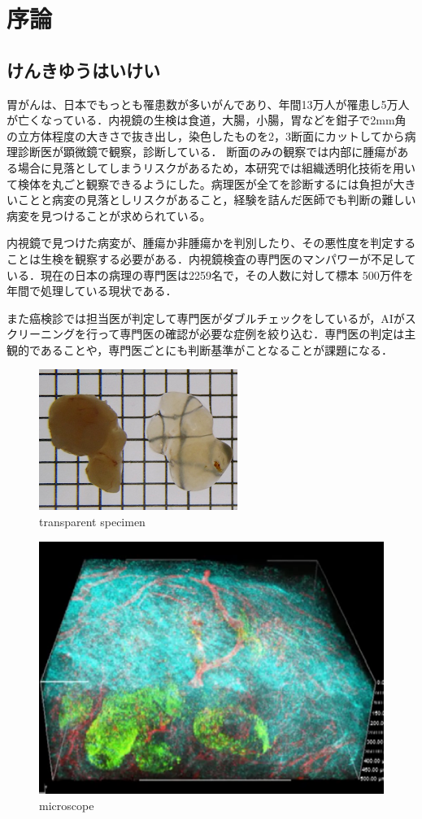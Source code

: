 \chapter{序論}
\label{chap_intro}
\section{けんきゆうはいけい}
胃がんは、日本でもっとも罹患数が多いがんであり、年間13万人が罹患し5万人が亡くなっている．内視鏡の生検は食道，大腸，小腸，胃などを鉗子で2mm角の立方体程度の大きさで抜き出し，染色したものを2，3断面にカットしてから病理診断医が顕微鏡で観察，診断している．
断面のみの観察では内部に腫瘍がある場合に見落としてしまうリスクがあるため，本研究では組織透明化技術を用いて検体を丸ごと観察できるようにした。病理医が全てを診断するには負担が大きいことと病変の見落としリスクがあること，経験を詰んだ医師でも判断の難しい病変を見つけることが求められている。

内視鏡で見つけた病変が、腫瘍か非腫瘍かを判別したり、その悪性度を判定することは生検を観察する必要がある．内視鏡検査の専門医のマンパワーが不足している．現在の日本の病理の専門医は2259名で，その人数に対して標本 500万件を年間で処理している現状である．

また癌検診では担当医が判定して専門医がダブルチェックをしているが，AIがスクリーニングを行って専門医の確認が必要な症例を絞り込む．専門医の判定は主観的であることや，専門医ごとにも判断基準がことなることが課題になる．

\begin{figure}[H]
	\centering
	\includegraphics[width=0.7\linewidth]{fig/chapter1/lucid}
	\caption{transparent specimen}
	\label{fig:lucid}
\end{figure}

\begin{figure}[H]
	\centering
	\includegraphics[width=0.7\linewidth]{fig/chapter1/microscope}
	\caption{microscope}
	\label{fig:microscope}
\end{figure}

